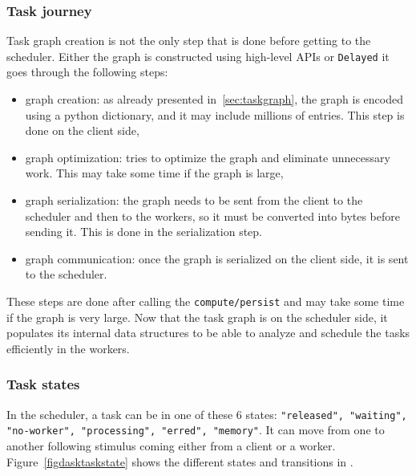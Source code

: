\subsubsection{Task journey}

Task graph creation is not the only step that is done before getting to the scheduler.
Either the graph is constructed using high-level APIs or \texttt{Delayed} it goes through the following steps:
\begin{itemize}
    \item graph creation: as already presented in~\ref{sec:taskgraph}, the graph is encoded using a python dictionary, and it may include millions of entries. This step is done on the client side, 
    \item graph optimization: \dask tries to optimize the graph and eliminate unnecessary work. This may take some time if the graph is large,
    \item graph serialization: the graph needs to be sent from the client to the scheduler and then to the workers, so it must be converted into bytes before sending it. This is done in the serialization step. 
    \item graph communication: once the graph is serialized on the client side, it is sent to the scheduler.
\end{itemize}
These steps are done after calling the \texttt{compute/persist} and may take some time if the graph is very large. 
Now that the task graph is on the scheduler side, it populates its internal data structures to be able to analyze and schedule the tasks efficiently in the workers.

\subsubsection{Task states}
In the \dask scheduler, a task can be in one of these 6 states: \texttt{"released", "waiting", "no-worker", "processing", "erred", "memory"}. It can move from one to another following stimulus coming either from a client or a worker. Figure~\ref{figdasktaskstate} shows the different states and transitions in \dask. 

